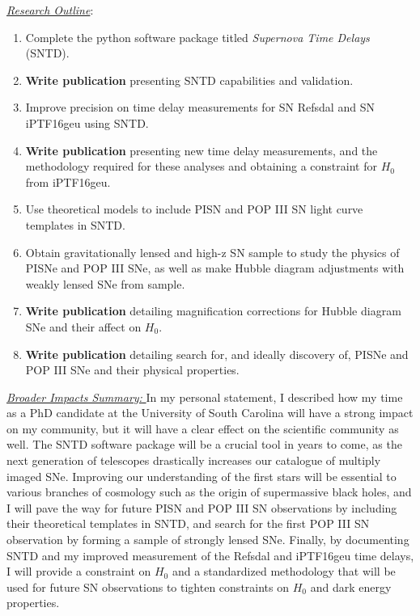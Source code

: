 \noindent\underline{\textit{Research Outline}}:
\begin{enumerate}
\item
Complete  the python  software package  titled \textit{Supernova  Time
Delays} (SNTD).
\item
\textbf{Write publication} presenting SNTD capabilities and validation.
\item
Improve precision  on time  delay measurements for  SN Refsdal  and SN
iPTF16geu using SNTD.
\item
\textbf{Write publication} presenting new time delay measurements, and the methodology required for these analyses and obtaining a constraint for $H_0$ from iPTF16geu.
\item
Use theoretical  models to  include PISN  and POP  III SN  light curve
templates in SNTD.
\item
Obtain  gravitationally  lensed and  high-z  SN  sample to  study  the
physics  of PISNe  and POP  III SNe,  as well  as make  Hubble diagram
adjustments with weakly lensed SNe from sample.
\item
\textbf{Write publication} detailing magnification corrections for Hubble diagram SNe and their affect on $H_0$.
\item
\textbf{Write publication} detailing search for, and ideally discovery of, PISNe and POP III SNe and their physical properties.
\end{enumerate}

\noindent\underline{\textit{Broader Impacts Summary: }}
In my personal  statement, I described how my time  as a PhD candidate
at the  University of South Carolina  will have a strong  impact on my
community, but it will have a clear effect on the scientific community
as well. The SNTD software package will  be a crucial tool in years to
come, as the  next generation of telescopes  drastically increases our
catalogue of multiply  imaged SNe. Improving our  understanding of the
first stars will be essential to various branches of cosmology such as
the origin  of supermassive black holes,  and I will pave  the way for
future PISN and POP III SN observations by including their theoretical
templates in SNTD, and search for  the first POP III SN observation by
forming a sample of strongly  lensed SNe. Finally, by documenting SNTD
and my improved measurement of  the Refsdal and iPTF16geu time delays,
I will  provide a constraint  on $H_0$ and a  standardized methodology
that will be used for future SN observations to tighten constraints on
$H_0$ and dark energy properties.
